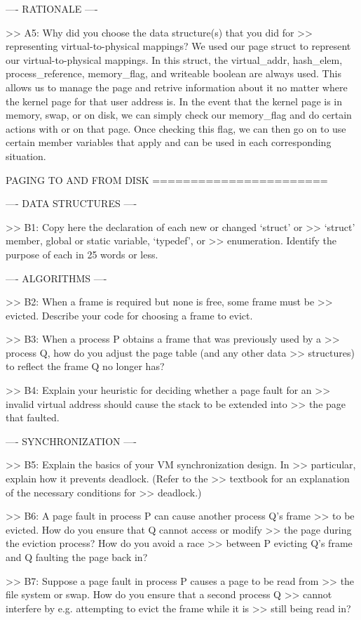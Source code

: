 ---- RATIONALE ----

>> A5: Why did you choose the data structure(s) that you did for
>> representing virtual-to-physical mappings?
We used our page struct to represent our virtual-to-physical mappings. In this struct, the 
virtual_addr, hash_elem, process_reference, memory_flag, and writeable boolean are always 
used. This allows us to manage the page and retrive information about it no matter where
the kernel page for that user address is. In the event that the kernel page is in memory, 
swap, or on disk, we can simply check our memory_flag and do certain actions with or on that
page. Once checking this flag, we can then go on to use certain member variables that apply
and can be used in each corresponding situation.

               PAGING TO AND FROM DISK
               =======================

---- DATA STRUCTURES ----

>> B1: Copy here the declaration of each new or changed `struct' or
>> `struct' member, global or static variable, `typedef', or
>> enumeration.  Identify the purpose of each in 25 words or less.

---- ALGORITHMS ----

>> B2: When a frame is required but none is free, some frame must be
>> evicted.  Describe your code for choosing a frame to evict.

>> B3: When a process P obtains a frame that was previously used by a
>> process Q, how do you adjust the page table (and any other data
>> structures) to reflect the frame Q no longer has?

>> B4: Explain your heuristic for deciding whether a page fault for an
>> invalid virtual address should cause the stack to be extended into
>> the page that faulted.

---- SYNCHRONIZATION ----

>> B5: Explain the basics of your VM synchronization design.  In
>> particular, explain how it prevents deadlock.  (Refer to the
>> textbook for an explanation of the necessary conditions for
>> deadlock.)

>> B6: A page fault in process P can cause another process Q's frame
>> to be evicted.  How do you ensure that Q cannot access or modify
>> the page during the eviction process?  How do you avoid a race
>> between P evicting Q's frame and Q faulting the page back in?

>> B7: Suppose a page fault in process P causes a page to be read from
>> the file system or swap.  How do you ensure that a second process Q
>> cannot interfere by e.g. attempting to evict the frame while it is
>> still being read in?

